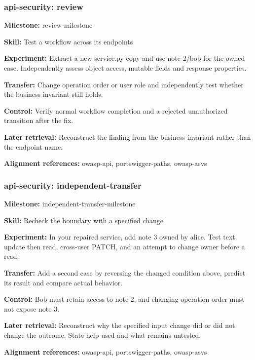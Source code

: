 \subsubsection{api-security: review}
\noindent\textbf{Milestone:} review-milestone\par
\noindent\textbf{Skill:} Test a workflow across its endpoints\par
\noindent\textbf{Experiment:} Extract a new service.py copy and use note 2/bob for the owned case. Independently assess object access, mutable fields and response properties.\par
\noindent\textbf{Transfer:} Change operation order or user role and independently test whether the business invariant still holds.\par
\noindent\textbf{Control:} Verify normal workflow completion and a rejected unauthorized transition after the fix.\par
\noindent\textbf{Later retrieval:} Reconstruct the finding from the business invariant rather than the endpoint name.\par
\noindent\textbf{Alignment references:} owasp-api, portswigger-paths, owasp-asvs\par
\subsubsection{api-security: independent-transfer}
\noindent\textbf{Milestone:} independent-transfer-milestone\par
\noindent\textbf{Skill:} Recheck the boundary with a specified change\par
\noindent\textbf{Experiment:} In your repaired service, add note 3 owned by alice. Test text update then read, cross-user PATCH, and an attempt to change owner before a read.\par
\noindent\textbf{Transfer:} Add a second case by reversing the changed condition above, predict its result and compare actual behavior.\par
\noindent\textbf{Control:} Bob must retain access to note 2, and changing operation order must not expose note 3.\par
\noindent\textbf{Later retrieval:} Reconstruct why the specified input change did or did not change the outcome. State help used and what remains untested.\par
\noindent\textbf{Alignment references:} owasp-api, portswigger-paths, owasp-asvs\par
